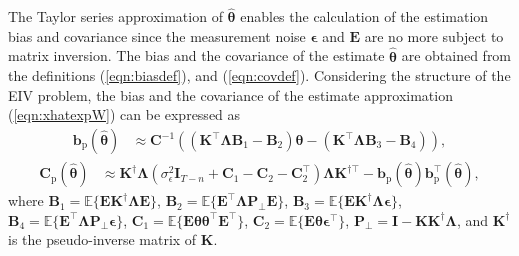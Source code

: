 The Taylor series approximation of $\widehat{\bm{\theta}}$ enables the calculation of the estimation bias and covariance since the measurement noise $\bm{\epsilon}$ and $\mathbf{E}$ are no more subject to matrix inversion. 
The bias and the covariance of the estimate $\widehat{\bm{\theta}}$ are obtained from the definitions (\ref{eqn:biasdef}), and (\ref{eqn:covdef}). %
Considering the structure of the EIV problem, the bias and the covariance of the estimate approximation (\ref{eqn:xhatexpW}) can be expressed as
\begin{equation} \begin{aligned} \mathbf{b}_{\mathrm{p}} \left( \widehat{\bm{\theta}} \right) & \approx \mathbf{C}^{-1} \left(  \left( \mathbf{K}^\top \bm{\Lambda} \mathbf{B}_1 - \mathbf{B}_2 \right) \bm{\theta} - \left( \mathbf{K}^\top \bm{\Lambda} \mathbf{B}_3 - \mathbf{B}_4 \right) \right), \end{aligned} \label{eqn:biasEW} \end{equation}
\begin{equation} \begin{aligned} \mathbf{C}_{\mathrm{p}} \left( \widehat{\bm{\theta}} \right) & \approx \mathbf{K}^\dagger \bm{\Lambda} \left( \sigma_{\epsilon}^2 \mathbf{I}_{T-n} + \mathbf{C}_1 - \mathbf{C}_2 - \mathbf{C}_2^\top \right) \bm{\Lambda} \mathbf{K}^{\dagger \top} - \mathbf{b}_{\mathrm{p}} \left( \widehat{\bm{\theta}} \right) \mathbf{b}_{\mathrm{p}}^\top \left( \widehat{\bm{\theta}} \right), \end{aligned} \label{eqn:varEW} \end{equation}
where $\mathbf{B}_1 = \mathbb{E} \Big\{ \mathbf{E} \mathbf{K}^\dagger \bm{\Lambda} \mathbf{E} \Big\}$, $\mathbf{B}_2 = \mathbb{E} \Big\{ \mathbf{E}^\top \bm{\Lambda} \mathbf{P}_\perp \mathbf{E} \Big\}$, $\mathbf{B}_3 = \mathbb{E} \Big\{ \mathbf{E} \mathbf{K}^\dagger \bm{\Lambda} \bm{\epsilon} \Big\}$, $\mathbf{B}_4 = \mathbb{E} \Big\{ \mathbf{E}^\top \bm{\Lambda} \mathbf{P}_\perp \bm{\epsilon} \Big\}$, $\mathbf{C}_1 = \mathbb{E} \Big\{ \mathbf{E} \bm{\theta} \bm{\theta}^\top \mathbf{E}^\top \Big\}$, $\mathbf{C}_2 = \mathbb{E} \Big\{ \mathbf{E} \bm{\theta} \bm{\epsilon}^\top \Big\}$, $\mathbf{P}_\perp = \mathbf{I} - \mathbf{K} \mathbf{K}^\dagger \bm{\Lambda}$, and $\mathbf{K}^\dagger$ is the pseudo-inverse matrix of $\mathbf{K}$. 


